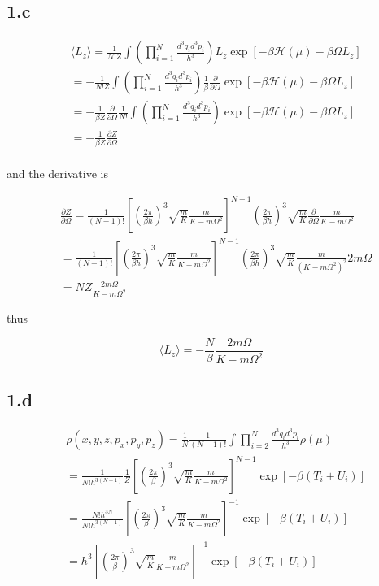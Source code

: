 \documentclass{article}
\begin{document}
\subsection*{1.c}

$$
\begin{aligned}
    &\langle L_z \rangle = \frac{1}{N!Z}\int (\prod_{i=1}^N \frac{d^3q_i d^3p_i}{h^3}) L_z \exp[-\beta \mathcal{H(\mu)} - \beta \Omega L_z]\\
    &= -\frac{1}{N!Z}\int (\prod_{i=1}^N \frac{d^3q_i d^3p_i}{h^3}) \frac{1}{\beta} \frac{\partial}{\partial \Omega} \exp[-\beta \mathcal{H(\mu)} - \beta \Omega L_z]\\
    &= -\frac{1}{\beta Z} \frac{\partial}{\partial \Omega} \frac{1}{N!} \int (\prod_{i=1}^N \frac{d^3q_i d^3p_i}{h^3}) \exp[-\beta \mathcal{H(\mu)} - \beta \Omega L_z]\\
    &= -\frac{1}{\beta Z} \frac{\partial Z}{\partial \Omega}\\
\end{aligned}
$$

and the derivative is

$$
\begin{aligned}
    &\frac{\partial Z}{\partial \Omega} = \frac{1}{(N-1)!} [(\frac{2\pi}{\beta h})^3 \sqrt{\frac{m}{K}} \frac{m}{K - m\Omega^2}]^{N-1}
        (\frac{2\pi}{\beta h})^3 \sqrt{\frac{m}{K}} \frac{\partial}{\partial \Omega} \frac{m}{K - m\Omega^2}\\
    &=\frac{1}{(N-1)!} [(\frac{2\pi}{\beta h})^3 \sqrt{\frac{m}{K}} \frac{m}{K - m\Omega^2}]^{N-1}
    (\frac{2\pi}{\beta h})^3 \sqrt{\frac{m}{K}} \frac{m}{(K - m\Omega^2)^2} 2m\Omega\\
    &= N Z \frac{2m\Omega}{K - m\Omega^2}
\end{aligned}
$$

thus

$$
\langle L_z \rangle = -\frac{N}{\beta} \frac{2m\Omega}{K - m\Omega^2}
$$

\subsection*{1.d}

$$
\begin{aligned}
    &\rho(x, y, z, p_x, p_y, p_z) = \frac{1}{N} \frac{1}{(N-1)!} \int \prod_{i=2}^N \frac{d^3q_i d^3p_i}{h^3} \rho(\mu)\\
    &= \frac{1}{N! h^{3(N-1)}} \frac{1}{Z} [(\frac{2\pi}{\beta})^3\sqrt{\frac{m}{K}} \frac{m}{K - m \Omega^2}]^{N-1} \exp[-\beta (T_i + U_i)]\\
    &= \frac{N!h^{3N}}{N! h^{3(N-1)}} [(\frac{2\pi}{\beta})^3\sqrt{\frac{m}{K}} \frac{m}{K - m \Omega^2}]^{-1} \exp[-\beta (T_i + U_i)]\\
    &= h^{3}[(\frac{2\pi}{\beta})^3\sqrt{\frac{m}{K}} \frac{m}{K - m \Omega^2}]^{-1} \exp[-\beta (T_i + U_i)]\\
\end{aligned}
$$
\end{document}

